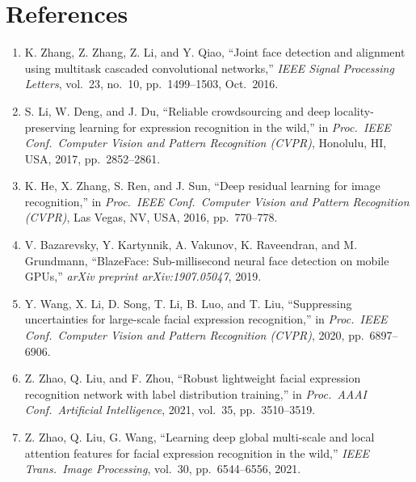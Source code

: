 \chapter{References}
\thispagestyle{plain}

\begin{enumerate}

\item K. Zhang, Z. Zhang, Z. Li, and Y. Qiao, ``Joint face detection and
alignment using multitask cascaded convolutional networks,''
\textit{IEEE Signal Processing Letters}, vol.\ 23, no.\ 10,
pp.\ 1499--1503, Oct.\ 2016.

\item S. Li, W. Deng, and J. Du, ``Reliable crowdsourcing and deep
locality-preserving learning for expression recognition in the wild,''
in \textit{Proc.\ IEEE Conf.\ Computer Vision and Pattern Recognition
(CVPR)}, Honolulu, HI, USA, 2017, pp.\ 2852--2861.

\item K. He, X. Zhang, S. Ren, and J. Sun, ``Deep residual learning for
image recognition,'' in \textit{Proc.\ IEEE Conf.\ Computer Vision and
Pattern Recognition (CVPR)}, Las Vegas, NV, USA, 2016, pp.\ 770--778.

\item V. Bazarevsky, Y. Kartynnik, A. Vakunov, K. Raveendran, and
M. Grundmann, ``BlazeFace: Sub-millisecond neural face detection on
mobile GPUs,'' \textit{arXiv preprint arXiv:1907.05047}, 2019.

\item Y. Wang, X. Li, D. Song, T. Li, B. Luo, and T. Liu,
``Suppressing uncertainties for large-scale facial expression recognition,''
in \textit{Proc.\ IEEE Conf.\ Computer Vision and Pattern Recognition
(CVPR)}, 2020, pp.\ 6897--6906.

\item Z. Zhao, Q. Liu, and F. Zhou, ``Robust lightweight facial expression
recognition network with label distribution training,'' in \textit{Proc.\
AAAI Conf.\ Artificial Intelligence}, 2021, vol.\ 35, pp.\ 3510--3519.

\item Z. Zhao, Q. Liu, G. Wang, ``Learning deep global multi-scale and
local attention features for facial expression recognition in the wild,''
\textit{IEEE Trans.\ Image Processing}, vol.\ 30, pp.\ 6544--6556, 2021.


\end{enumerate}

